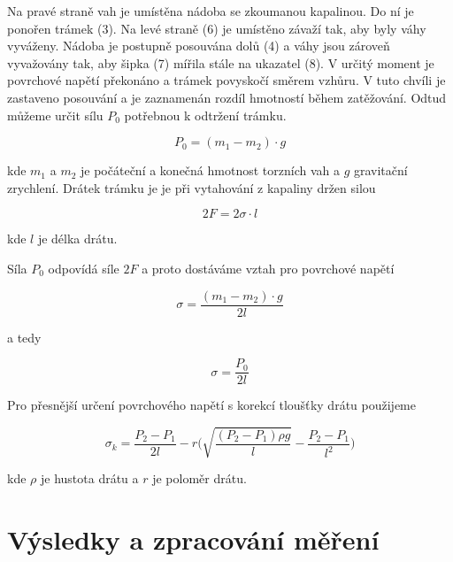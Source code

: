 Na pravé straně vah je umístěna nádoba se zkoumanou kapalinou. Do ní je ponořen trámek (3). Na levé straně (6) je umístěno závaží tak, aby byly váhy vyváženy. Nádoba je postupně posouvána dolů (4) a váhy jsou zároveň vyvažovány tak, aby šipka (7) mířila stále na ukazatel (8). V určitý moment je povrchové napětí překonáno a trámek povyskočí směrem vzhůru. V tuto chvíli je zastaveno posouvání a je zaznamenán rozdíl hmotností během zatěžování. Odtud můžeme určit sílu \(P_0\) potřebnou k odtržení trámku.

\begin{equation}
    P_0 = (m_1 - m_2) \cdot g
\end{equation}

kde \(m_1\) a \(m_2\) je počáteční a konečná hmotnost torzních vah a \(g\) gravitační zrychlení. Drátek trámku je je při vytahování z kapaliny držen silou

\begin{equation}
    2F = 2 \sigma \cdot l
\end{equation}

kde \(l\) je délka drátu.

Síla \(P_0\) odpovídá síle \(2F\) a proto dostáváme vztah pro povrchové napětí

\begin{equation}
    \sigma = \frac{(m_1 - m_2)\cdot g}{2l}
\end{equation}

a tedy

\begin{equation}
    \sigma = \frac{P_0}{2l}
\end{equation}

Pro přesnější určení povrchového napětí s korekcí tloušťky drátu použijeme

\begin{equation}
    \sigma_k = \frac{P_2 - P_1}{2l}-r\Bigg(\sqrt{\frac{(P_2 - P_1)\rho g}{l}}-\frac{P_2 - P_1}{l^2} \Bigg)
\end{equation}

kde \(\rho\) je hustota drátu a \(r\) je poloměr drátu.

\section{Výsledky a zpracování měření}

